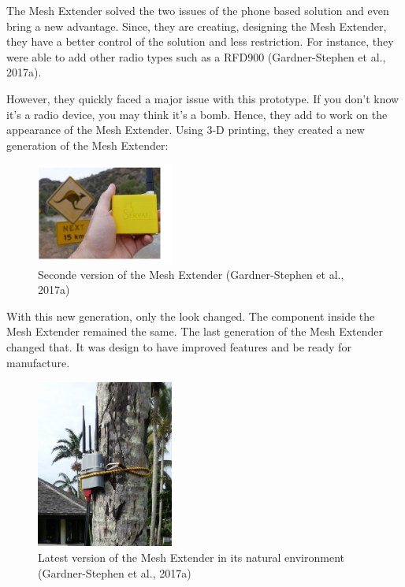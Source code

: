 The Mesh Extender solved the two issues of the phone based solution and even bring a new advantage.
Since, they are creating, designing the Mesh Extender, they have a better control of the solution and less restriction. For instance, they were able to add other radio types such as a RFD900 (Gardner-Stephen et al., 2017a).



However, they quickly faced a major issue with this prototype. If you don't know it's a radio device, you may think it's a bomb. Hence, they add to work on the appearance of the Mesh Extender. Using 3-D printing, they created a new generation of the Mesh Extender:


\begin{figure}[H]
\begin{center}
\includegraphics[width=0.4\textwidth]{image/meshextenderproto2.png}%
\caption{Seconde version of the Mesh Extender (Gardner-Stephen et al., 2017a)}%
\label{figure:protoMesh2}%
\end{center}
\end{figure}


With this new generation, only the look changed. The component inside the Mesh Extender remained the same.
The last generation of the Mesh Extender changed that. It was design to have improved features and be ready for manufacture.


\begin{figure}[H]
\begin{center}
\includegraphics[width=0.4\textwidth]{image/meshextenderproto3.png}%
\caption{Latest version of the Mesh Extender in its natural environment (Gardner-Stephen et al., 2017a)}%
\label{figure:protoMesh3}%
\end{center}
\end{figure}


